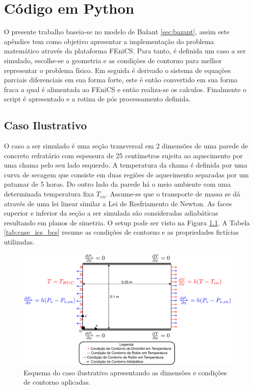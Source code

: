 \chapter{Código em Python} \label{codigo}

O presente trabalho baseia-se no modelo de Ba\v{z}ant \ref{sec:bazant}, assim
este apêndice tem como objetivo apresentar a implementação do problema
matemático através da plataforma FEniCS. Para tanto, é definida um caso a ser
simulado, escolhe-se a geometria e as condições de contorno para melhor
representar o problema físico. Em seguida é derivado o sistema de equações
parciais diferenciais em sua forma forte, este é então convertido em sua forma
fraca a qual é alimentada ao FEniCS e então realiza-se os calculos. Finalmente o
script é apresentado e a rotina de pós processamento definida.

    \section{Caso Ilustrativo}\label{mat:caso}
    O caso a ser simulado é uma seção transversal em 2 dimensões de uma parede
    de concreto refratário com espessura de 25 centímetros sujeita ao
    aquecimento por uma chama pelo seu lado esquerdo. A temperatura da chama é
    definida por uma curva de secagem que consiste em duas regiões de
    aquecimento separadas por um patamar de 5 horas. Do outro lado da parede há
    o meio ambiente com uma determinada temperatura fixa $T_{en}$. Assume-se que
    o transporte de massa se dá através de uma lei linear similar a Lei de
    Resfriamento de Newton. As faces superior e inferior da seção a ser simulada
    são consideradas adiabáticas resultando em planos de simetria. O setup pode
    ser visto na Figura \ref{fig:case}. A Tabela \ref{tab:case_ics_bcs}  resume
    as condições de contorno e as propriedades fictícias utilizadas.

  \begin{figure}[ht]
	\centering
	\includegraphics[width=14cm]{./figures/case.pdf}
	\caption{Esquema do caso ilustrativo apresentando as dimensões e condições de
    contorno aplicadas.  \label{fig:case}}
  \end{figure}

